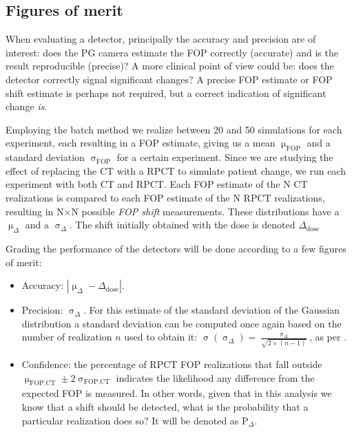 \documentclass[a4paper,english]{article}
\begin{document}
\subsection{Figures of merit}\label{figmerit}

When evaluating a detector, principally the accuracy and precision are of interest: does the PG camera estimate the FOP correctly (accurate) and is the result reproducible (precise)? A more clinical point of view could be: does the detector correctly signal significant changes? A precise FOP estimate or FOP shift estimate is perhaps not required, but a correct indication of significant change \emph{is}.

Employing the batch method we realize between 20 and 50 simulations for each experiment, each resulting in a FOP estimate, giving us a mean $\upmu_\textrm{FOP}$ and a standard deviation $\upsigma_\textrm{FOP}$ for a certain experiment. Since we are studying the effect of replacing the CT with a RPCT to simulate patient change, we run each experiment with both CT and RPCT. Each FOP estimate of the N CT realizations is compared to each FOP estimate of the N RPCT realizations, resulting in N$\times$N possible \emph{FOP shift} measurements. These distributions have a $\upmu_\Delta$ and a $\upsigma_\Delta$. The shift initially obtained with the dose is denoted $\Delta_\textrm{dose}$

Grading the performance of the detectors will be done according to a few figures of merit: 

\begin{itemize}[noitemsep]
\item Accuracy: $| \upmu_{\Delta} - \Delta_\textrm{dose}|$.
\item Precision: $\upsigma_\Delta$. For this estimate of the standard deviation of the Gaussian distribution a standard deviation can be computed once again based on the number of realization $n$ used to obtain it: $\upsigma(\upsigma_\Delta)=\frac{\upsigma_\Delta}{\sqrt{2\times(n-1)}}$, as per \citet[formula 4.54]{Leo1994}.
\item Confidence: the percentage of RPCT FOP realizations that fall outside $\upmu_\textrm{FOP,CT}\pm2\upsigma_\textrm{FOP,CT}$ indicates the likelihood any difference from the expected FOP is measured. In other words, given that in this analysis we know that a shift should be detected, what is the probability that a particular realization does so? It will be denoted as P$_\Delta$.
\end{itemize}
\end{document}
